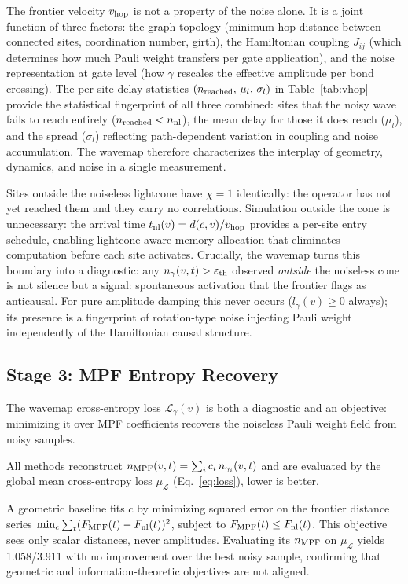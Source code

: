 \documentclass[letterpaper]{article}
\begin{document}
The frontier velocity $v_{\rm hop}$ is not a property of the noise alone.
It is a joint function of three factors: the graph topology (minimum hop
distance between connected sites, coordination number, girth), the
Hamiltonian coupling $J_{ij}$ (which determines how much Pauli weight
transfers per gate application), and the noise representation at gate
level (how $\gamma$ rescales the effective amplitude per bond crossing).
The per-site delay statistics $(n_{\rm reached},\,\mu_l,\,\sigma_l)$
in Table~\ref{tab:vhop} provide the statistical fingerprint of all
three combined: sites that the noisy wave fails to reach entirely
($n_{\rm reached} < n_{\rm nl}$), the mean delay for those it does
reach ($\mu_l$), and the spread ($\sigma_l$) reflecting path-dependent
variation in coupling and noise accumulation.
The wavemap therefore characterizes the interplay of geometry, dynamics,
and noise in a single measurement.

Sites outside the noiseless lightcone have $\chi=1$ identically: the
operator has not yet reached them and they carry no correlations.
Simulation outside the cone is unnecessary: the arrival time
$t_{\rm nl}(v) = d(c,v)/v_{\rm hop}$ provides a per-site entry
schedule, enabling lightcone-aware memory allocation that eliminates
computation before each site activates.
Crucially, the wavemap turns this boundary into a diagnostic: any
$n_\gamma(v,t) > \varepsilon_{\rm th}$ observed \emph{outside} the
noiseless cone is not silence but a signal: spontaneous activation
that the frontier flags as anticausal.
For pure amplitude damping this never occurs ($l_\gamma(v) \geq 0$
always); its presence is a fingerprint of rotation-type noise injecting
Pauli weight independently of the Hamiltonian causal structure.

\subsection{Stage 3: MPF Entropy Recovery}

The wavemap cross-entropy loss $\mathcal{L}_\gamma(v)$ is both a
diagnostic and an objective: minimizing it over MPF coefficients
recovers the noiseless Pauli weight field from noisy samples.

All methods reconstruct $n_{\rm MPF}(v,t) = \sum_i c_i\, n_{\gamma_i}(v,t)$
and are evaluated by the global mean cross-entropy loss $\mu_\mathcal{L}$
(Eq.~\ref{eq:loss}), lower is better.

A geometric baseline fits $c$ by minimizing squared error on the
frontier distance series $\min_c \sum_t (F_{\rm MPF}(t)-F_{\rm nl}(t))^2$,
subject to $F_{\rm MPF}(t)\leq F_{\rm nl}(t)$.
This objective sees only scalar distances, never amplitudes.
Evaluating its $n_{\rm MPF}$ on $\mu_\mathcal{L}$ yields 1.058/3.911
with no improvement over the best noisy sample, confirming that
geometric and information-theoretic objectives are not aligned.
\end{document}
